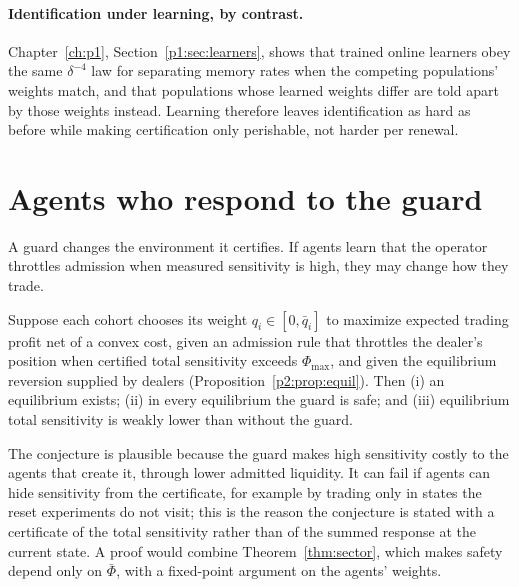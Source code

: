 \paragraph{Identification under learning, by contrast.} Chapter~\ref{ch:p1}, Section~\ref{p1:sec:learners}, shows that trained online learners obey the same $\delta^{-4}$ law for separating memory rates when the competing populations' weights match, and that populations whose learned weights differ are told apart by those weights instead. Learning therefore leaves identification as hard as before while making certification only perishable, not harder per renewal.

\section{Agents who respond to the guard}\label{sec:bl_strategic}

A guard changes the environment it certifies. If agents learn that the operator throttles admission when measured sensitivity is high, they may change how they trade.

\begin{conjecture}\label{conj:strategic}
Suppose each cohort chooses its weight $q_i\in[0,\bar q_i]$ to maximize expected trading profit net of a convex cost, given an admission rule that throttles the dealer's position when certified total sensitivity exceeds $\Phi_{\max}$, and given the equilibrium reversion supplied by dealers (Proposition~\ref{p2:prop:equil}). Then (i) an equilibrium exists; (ii) in every equilibrium the guard is safe; and (iii) equilibrium total sensitivity is weakly lower than without the guard. \hfill\Conj
\end{conjecture}

The conjecture is plausible because the guard makes high sensitivity costly to the agents that create it, through lower admitted liquidity. It can fail if agents can hide sensitivity from the certificate, for example by trading only in states the reset experiments do not visit; this is the reason the conjecture is stated with a certificate of the total sensitivity rather than of the summed response at the current state. A proof would combine Theorem~\ref{thm:sector}, which makes safety depend only on $\bar\Phi$, with a fixed-point argument on the agents' weights.
